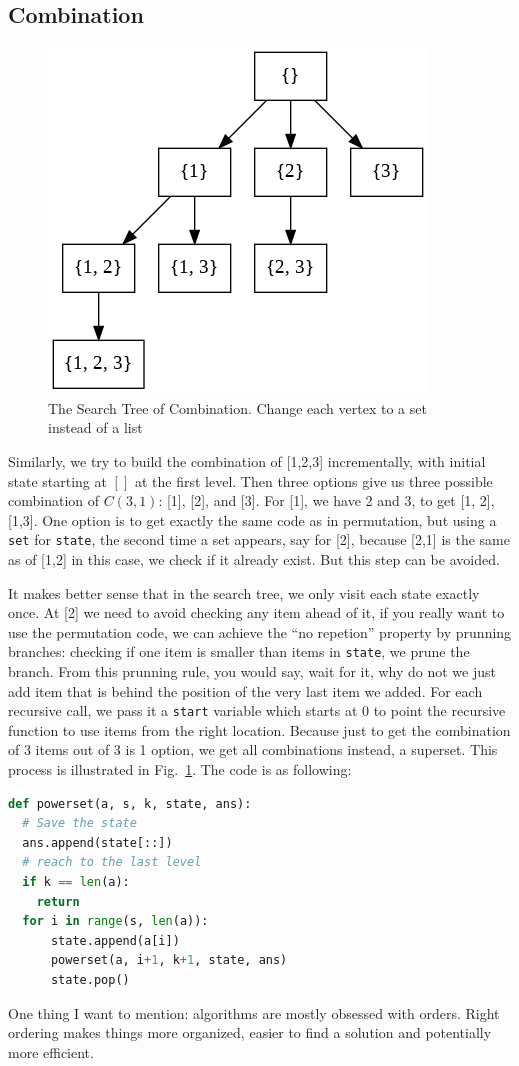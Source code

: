 \documentclass[../main.tex]{subfiles}
\begin{document}
\subsection{Combination} 
\begin{figure}[!ht]
    \centering
    \includegraphics[width= 0.7\columnwidth]{fig/combination.png}
    \caption{The Search Tree of Combination. Change each vertex to a set instead of a list}
    \label{fig:backtrack_combination}
\end{figure}
Similarly, we try to build the combination of [1,2,3] incrementally, with initial state starting at $[]$ at the first level. Then three options give us three possible combination of $C(3,1)$: [1], [2], and [3].  For [1], we have 2 and 3, to get [1, 2], [1,3]. One option is to get exactly the same code as in permutation, but using a \texttt{set} for \texttt{state}, the second time a set appears, say  for [2], because [2,1] is the same as of [1,2] in this case, we check if it already exist. But this step can be avoided.

It makes better sense that in the search tree, we only visit each state exactly once. At [2] we need to avoid checking any item ahead of it, if you really want to use the permutation code, we can achieve the ``no repetion'' property by prunning branches: checking if one item is smaller than items in \texttt{state}, we prune the branch. From this prunning rule, you would say, wait for it, why do not we just add item that is behind the position of the very last item we added. For each recursive call, we pass it a \texttt{start} variable which starts at $0$ to point the recursive function to use items from the right location.  Because just to get the combination of 3 items out of 3 is 1 option, we get all combinations instead, a superset. This process is illustrated in Fig.~\ref{fig:backtrack_combination}. The code is as following: 
\begin{lstlisting}[language=Python]
def powerset(a, s, k, state, ans):
  # Save the state
  ans.append(state[::])
  # reach to the last level
  if k == len(a):   
    return
  for i in range(s, len(a)):
      state.append(a[i])
      powerset(a, i+1, k+1, state, ans)
      state.pop()
\end{lstlisting}
One thing I want to mention: algorithms are mostly obsessed with orders. Right ordering makes things more organized, easier to find a solution and potentially more efficient. 
\end{document}
